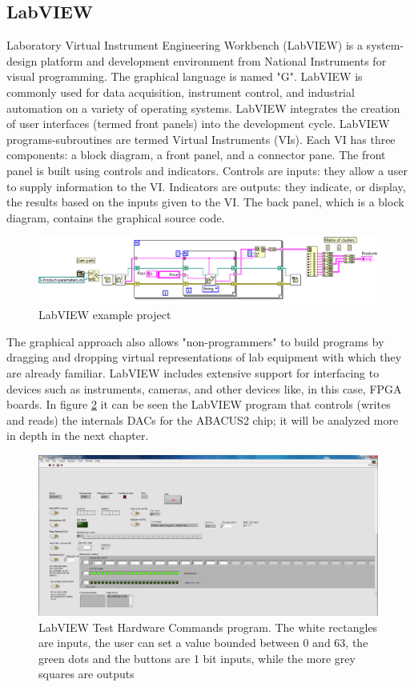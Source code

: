 \subsection{LabVIEW}
\noindent Laboratory Virtual Instrument Engineering Workbench (LabVIEW) is a system-design platform and development environment from National Instruments for visual programming.
The graphical language is named "G". LabVIEW is commonly used for data acquisition, instrument control, and industrial automation on a variety of operating systems.
LabVIEW integrates the creation of user interfaces (termed front panels) into the development cycle. LabVIEW programs-subroutines are termed Virtual Instruments (VIs). Each VI has three components: a block diagram, a front panel, and a connector pane.
The front panel is built using controls and indicators. Controls are inputs: they allow a user to supply information to the VI. Indicators are outputs: they indicate, or display, the results based on the inputs given to the VI. The back panel, which is a block diagram, contains the graphical source code.
\begin{figure}[H]
	\centering
	\includegraphics[width=0.9\linewidth]{IMG/ch3/LABVIEW}
	\caption{LabVIEW example project}
	\label{fig:labview}
\end{figure}
\noindent The graphical approach also allows "non-programmers" to build programs by dragging and dropping virtual representations of lab equipment with which they are already familiar.
\newline
LabVIEW includes extensive support for interfacing to devices such as instruments, cameras, and other devices like, in this case, FPGA boards.
\newline
In figure \ref{fig:labview2} it can be seen the LabVIEW program that controls (writes and reads) the internals DACs for the ABACUS2 chip; it will be analyzed more in depth in the next chapter.
\begin{figure}[H]
	\centering
	\includegraphics[width=0.8\linewidth]{IMG/ch3/LABVIEW2}
	\caption{LabVIEW Test Hardware Commands program. The white rectangles are inputs, the user can set a value bounded between 0 and 63, the green dots and the buttons are 1 bit inputs, while the more grey squares are outputs}
	\label{fig:labview2}
\end{figure}



